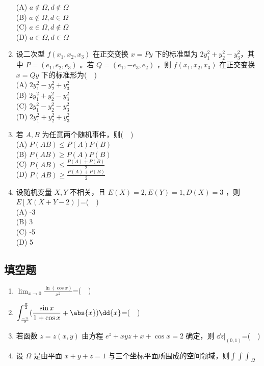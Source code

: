 \begin{enumerate}
(A) $a\notin \Omega,d\notin \Omega$ \\
(B) $a\notin \Omega,d\in \Omega$\\
(C) $a\in \Omega,d\notin \Omega$\\
(D) $a\in \Omega,d\in \Omega$\\
\item 设二次型 $f(x_1,x_2,x_3)$ 在正交变换  $x=Py$ 下的标准型为 $2y_1^2+y_2^2-y_3^2$，其中 $P=(e_1,e_2,e_3)$ 。若 $Q=(e_1,-e_3,e_2)$ ，则 $f(x_1,x_2,x_3)$  在正交变换 $x=Qy$  下的标准形为($\quad$)\\
(A) $2y_1^2-y_2^2+y_3^2$\\
(B) $2y_1^2+y_2^2-y_3^2$\\
(C) $2y_1^2-y_2^2-y_3^2$\\
(D) $2y_1^2+y_2^2+y_3^2$
\item 若 $A,B$ 为任意两个随机事件，则($\quad$)\\
(A) $P(AB)\le P(A)P(B)$\\
(B) $P(AB) \ge P(A)P(B)$\\
(C) $\displaystyle P(AB)\le \frac{P(A)+P(B)}{2}$\\
(D) $\displaystyle P(AB)\ge \frac{P(A)+P(B)}{2}$
\item  设随机变量 $X,Y$ 不相关，且 $E(X)=2,E(Y)=1,D(X)=3$  ，则 $E[X(X+Y-2)]$=($\quad$)\\
(A) -3\\
(B) 3\\
(C) -5\\
(D) 5
\end{enumerate}
\subsection{填空题}
\begin{enumerate}
\item $\displaystyle \lim_{x \to 0} \frac{\ln(\cos x)}{x^2}$=($\quad$)
\item $\displaystyle \int_\frac{-\pi}{2}^\frac{\pi}{2}(\frac{\sin x}{1+\cos x}+\abs{x})\dd{x}$=($\quad$)
\item 若函数 $z=z(x,y)$ 由方程 $e^z+xyz+x+\cos x=2$ 确定，则 $\dd{z}|_{(0,1)}$=($\quad$)
\item 设 $\Omega$ 是由平面 $x+y+z=1$ 与三个坐标平面所围成的空间领域，则$\displaystyle {\int\int\int}_\Omega$
\end{enumerate}
